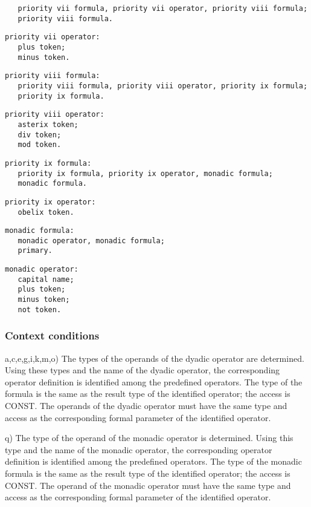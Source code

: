 \documentclass [a4paper,12pt,fleqn]{article}
\begin{document}
\begin{letterlist}
\begin{verbatim}
   priority vii formula, priority vii operator, priority viii formula;
   priority viii formula.
\end{verbatim}
\item
\begin{verbatim}
priority vii operator:
   plus token;
   minus token.
\end{verbatim}
\item
\begin{verbatim}
priority viii formula:
   priority viii formula, priority viii operator, priority ix formula;
   priority ix formula.
\end{verbatim}
\item
\begin{verbatim}
priority viii operator:
   asterix token;
   div token;
   mod token.
\end{verbatim}
\item
\begin{verbatim}
priority ix formula:
   priority ix formula, priority ix operator, monadic formula;
   monadic formula.
\end{verbatim}
\item
\begin{verbatim}
priority ix operator:
   obelix token.
\end{verbatim}
\item
\begin{verbatim}
monadic formula:
   monadic operator, monadic formula;
   primary.
\end{verbatim}
\item
\begin{verbatim}
monadic operator:
   capital name;
   plus token;
   minus token;
   not token.
\end{verbatim}
\end{letterlist}
\subsubsection*{Context conditions}
\begin{list}{-}{}
\item[a,c,e,g,i,k,m,o)]
The types of the operands of the dyadic operator are determined.
Using these types and the name of the dyadic operator, the corresponding
operator definition is identified among the predefined operators.
The type of the formula is the same as the result type of the
identified operator; the access is CONST. The operands of the dyadic
operator must have the same type and access as the corresponding formal
parameter of the identified operator.
\item[q)]
The type of the operand of the monadic operator is determined.
Using this type and the name of the monadic operator, the corresponding
operator definition is identified among the predefined operators.
The type of the monadic formula is the same as the result type of
the identified operator; the access is CONST. The operand of the
monadic operator must have the same type and access as the corresponding
formal parameter of the identified operator. 
\end{list}
\end{document}
